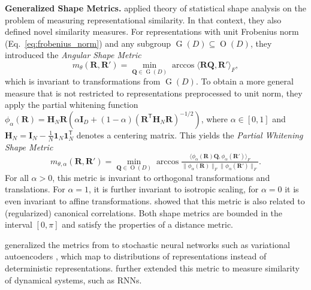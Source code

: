 \documentclass{article}
\newcommand{\citet}{\textcite}
\newcommand{\R}{\bm{R}}
\newcommand{\Rp}{\bm{R'}}
\newcommand{\transp}{\mathsf{T}}
\newcommand\myeqref[1]{%
    (\textup{Eq.~\ref{#1}})%
}
\newcommand{\subheader}{\textbf}
\begin{document}
\subheader{Generalized Shape Metrics.} \label{subsubsec:generalized_shape_metrics}
\citet{williams_generalized_2022} applied theory of statistical shape analysis on the problem of measuring representational similarity.
In that context, they also defined novel similarity measures.
For representations with unit Frobenius norm~\myeqref{eq:frobenius_norm} and any subgroup $\operatorname{G}(D)\subseteq \operatorname{O}(D)$, they introduced the \emph{Angular Shape Metric}
\begin{equation}\label{eq:angshapemetric}
    m_{\theta}(\R,\Rp) = \min_{\bm{Q} \in \operatorname{G}(D)} \operatorname{arccos} \langle \R \bm{Q}, \Rp\rangle_F,
\end{equation}
which is invariant to transformations from $\operatorname{G}(D)$.
To obtain a more general measure that is not restricted to representations preprocessed to unit norm, they apply the partial whitening function $\phi_\alpha(\R) = \bm{H}_N\R (\alpha \bm{I}_D + (1 - \alpha)(\R^\transp \bm{H}_N \R)^{-1/2})$, where $\alpha\in[0,1]$ and $\bm{H}_N= \bm{I}_N-\tfrac{1}{N}\bm{1}_N\bm{1}_N^\transp$ denotes a centering matrix.
This yields the \emph{Partial Whitening Shape Metric} %
\begin{equation}\label{eq:partialwhiteninghapemetric}
    m_{\theta,\alpha}(\R, \Rp) = \min_{\bm{Q}\in \operatorname{O}(D)} \arccos \tfrac{\langle \phi_\alpha(\R) \bm{Q}, \phi_\alpha(\Rp)\rangle_F}{\|\phi_\alpha(\R)\|_F \|\phi_\alpha(\Rp)\|_F}.
\end{equation}
For all $\alpha>0$, this metric is invariant to orthogonal transformations and translations.
For $\alpha=1$, it is further invariant to isotropic scaling, for $\alpha=0$ it is even invariant to affine transformations.
\citet{williams_generalized_2022} showed that this metric is also related to (regularized) canonical correlations.
Both shape metrics are bounded in the interval $[0,\pi]$ and satisfy the properties of a distance metric.

\citet{duong_representational_2022} generalized the metrics from \citet{williams_generalized_2022} to stochastic neural networks such as variational autoencoders \cite{kingma_auto-encoding_2014}, which map to distributions of representations instead of deterministic representations.
\citet{ostrow2023beyond} further extended this metric to measure similarity of dynamical systems, such as RNNs.
\end{document}
